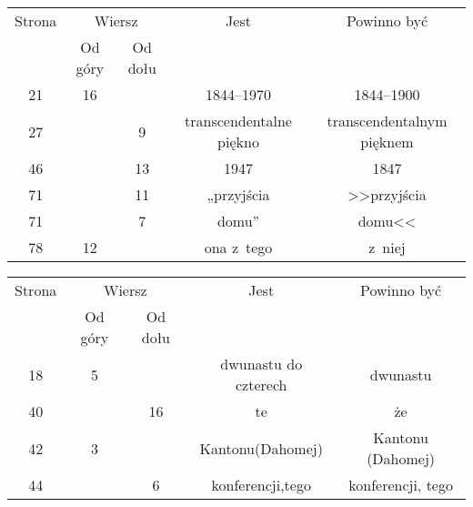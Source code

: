 \documentclass[a4paper,11pt]{article}
\begin{document}
\begin{center}

  \begin{tabular}{|c|c|c|c|c|}
    \hline
    Strona & \multicolumn{2}{c|}{Wiersz} & Jest
                              & Powinno być \\ \cline{2-3}
    & Od góry & Od dołu & & \\
    \hline
    21  & 16 & & 1844--1970 & 1844--1900 \\
    27  & &  9 & transcendentalne piękno & transcendentalnym pięknem \\
    46  & & 13 & 1947 & 1847 \\
    71  & & 11 & „przyjścia & >>przyjścia \\
    71  & &  7 & domu” & domu<< \\
    78  & 12 & & ona z~tego & z~niej \\
    \hline
  \end{tabular}

\end{center}









\newpage





\begin{center}

  \begin{tabular}{|c|c|c|c|c|}
    \hline
    Strona & \multicolumn{2}{c|}{Wiersz} & Jest
                              & Powinno być \\ \cline{2-3}
    & Od góry & Od dołu & & \\
    \hline
    18  &  5 & & dwunastu do czterech & dwunastu \\
    40  & & 16 & te & że \\
    42  &  3 & & Kantonu(Dahomej) & Kantonu (Dahomej) \\
    44  & &  6 & konferencji,tego & konferencji, tego \\
    \hline
  \end{tabular}

\end{center}













{}






\end{document}
